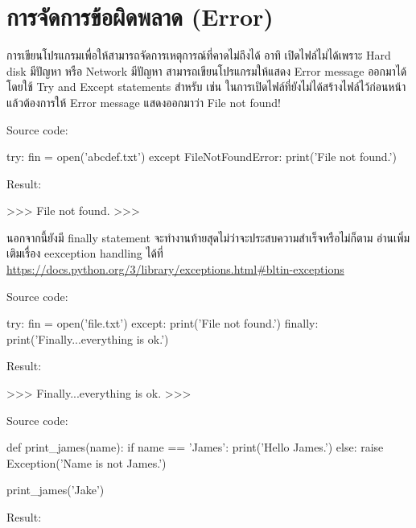 \section{การจัดการข้อผิดพลาด (Error)}

การเขียนโปรแกรมเพื่อให้สามารถจัดการเหตุการณ์ที่คาดไม่ถึงได้ อาทิ เปิดไฟล์ไม่ได้เพราะ Hard disk มีปัญหา หรือ Network มีปัญหา สามารถเขียนโปรแกรมให้แสดง Error message ออกมาได้ โดยใช้ Try and Except statements สำหรับ  เช่น ในการเปิดไฟล์ที่ยังไม่ได้สร้างไฟล์ไว้ก่อนหน้า แล้วต้องการให้ Error message แสดงออกมาว่า  File not found!

Source code:
\begin{pycode}
try:
    fin = open('abcdef.txt')
except FileNotFoundError:
    print('File not found.')
\end{pycode}

Result:
\begin{pycode}
>>>
File not found.
>>>
\end{pycode}

นอกจากนี้ยังมี finally statement จะทำงานท้ายสุดไม่ว่าจะประสบความสำเร็จหรือไม่ก็ตาม อ่านเพิ่มเติมเรื่อง eexception handling ได้ที่ \url{https://docs.python.org/3/library/exceptions.html\#bltin-exceptions}

Source code:
\begin{pycode}
try:
    fin = open('file.txt')
except:
    print('File not found.')
finally:
    print('Finally...everything is ok.')
\end{pycode}

Result:
\begin{pycode}
>>>
Finally...everything is ok.
>>>
\end{pycode}

Source code:
\begin{pycode}
def print_james(name):
    if name == 'James':
        print('Hello James.')
    else:
        raise Exception('Name is not James.')

print_james('Jake')
\end{pycode}

Result:
\begin{pycode}

\end{pycode}



